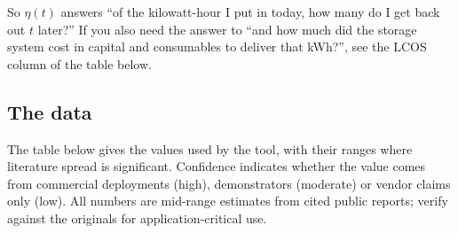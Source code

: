 So $\eta(t)$ answers ``of the kilowatt-hour I put in today, how many
do I get back out $t$ later?'' If you also need the answer to ``and
how much did the storage system cost in capital and consumables to
deliver that kWh?'', see the LCOS column of the table below.

\subsection*{The data}

The table below gives the values used by the tool, with their ranges
where literature spread is significant. Confidence indicates whether
the value comes from commercial deployments (high), demonstrators
(moderate) or vendor claims only (low). All numbers are mid-range
estimates from cited public reports; verify against the originals
for application-critical use.

